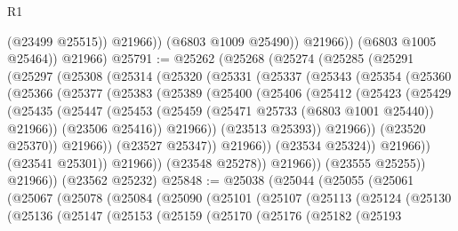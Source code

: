 \begin{lexlean}{R1}
\begin{coremodule}
                    (@23499 @25515))
                  @21966))
              (@6803 @1009 @25490))
            @21966))
        (@6803 @1005 @25464))
      @21966)
@25791 := @25262
    (@25268
      (@25274
        (@25285
          (@25291
            (@25297
              (@25308
                (@25314
                  (@25320
                    (@25331
                      (@25337
                        (@25343
                          (@25354
                            (@25360
                              (@25366
                                (@25377
                                  (@25383
                                    (@25389
                                      (@25400
                                        (@25406
                                          (@25412
                                            (@25423
                                              (@25429
                                                (@25435
                                                  (@25447
                                                    (@25453
                                                      (@25459
                                                        (@25471 @25733 (@6803 @1001 @25440))
                                                        @21966))
                                                    (@23506 @25416))
                                                  @21966))
                                              (@23513 @25393))
                                            @21966))
                                        (@23520 @25370))
                                      @21966))
                                  (@23527 @25347))
                                @21966))
                            (@23534 @25324))
                          @21966))
                      (@23541 @25301))
                    @21966))
                (@23548 @25278))
              @21966))
          (@23555 @25255))
        @21966))
    (@23562 @25232)
@25848 := @25038
    (@25044
      (@25055
        (@25061
          (@25067
            (@25078
              (@25084
                (@25090
                  (@25101
                    (@25107
                      (@25113
                        (@25124
                          (@25130
                            (@25136
                              (@25147
                                (@25153
                                  (@25159
                                    (@25170
                                      (@25176
                                        (@25182
                                          (@25193

\end{coremodule}
\end{lexlean}
